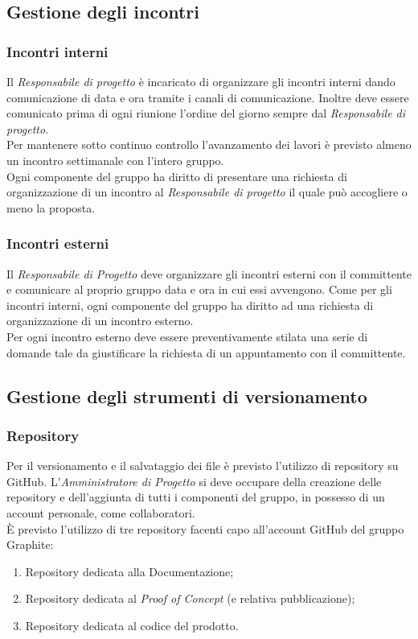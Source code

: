 \documentclass[../NormediProgetto.tex]{subfiles}
\begin{document}
	\subsection{Gestione degli incontri}
	
	\subsubsection{Incontri interni}
	
	Il \textit{Responsabile di progetto} è incaricato di organizzare gli incontri interni dando comunicazione di data e ora tramite i canali di comunicazione. Inoltre deve essere comunicato prima di ogni riunione l'ordine del giorno sempre dal \textit{Responsabile di progetto}.
	\\ \noindent Per mantenere sotto continuo controllo l'avanzamento dei lavori è previsto almeno un incontro settimanale con l'intero gruppo.
	\\ \noindent Ogni componente del gruppo ha diritto di presentare una richiesta di organizzazione di un incontro al \textit{Responsabile di progetto} il quale può accogliere o meno la proposta.
	
	\subsubsection{Incontri esterni}
	
	Il \textit{Responsabile di Progetto} deve organizzare gli incontri esterni con il committente e comunicare al proprio gruppo data e ora in cui essi avvengono. Come per gli incontri interni, ogni componente del gruppo ha diritto ad una richiesta di organizzazione di un incontro esterno.
	\\ \noindent Per ogni incontro esterno deve essere preventivamente stilata una serie di domande tale da giustificare la richiesta di un appuntamento con il committente.
	
	\subsection{Gestione degli strumenti di versionamento}
	
	\subsubsection{Repository}
	
	Per il versionamento e il salvataggio dei file è previsto l'utilizzo di repository su GitHub. L'\textit{Amministratore di Progetto} si deve occupare della creazione delle repository e dell'aggiunta di tutti i componenti del gruppo, in possesso di un account personale, come collaboratori.
	\\ \noindent È previsto l'utilizzo di tre repository facenti capo all'account GitHub del gruppo Graphite:
	\begin{enumerate}
		\item Repository dedicata alla Documentazione;
		\item Repository dedicata al \textit{Proof of Concept} (e relativa pubblicazione);
		\item Repository dedicata al codice del prodotto.
	\end{enumerate}
	
\end{document}
